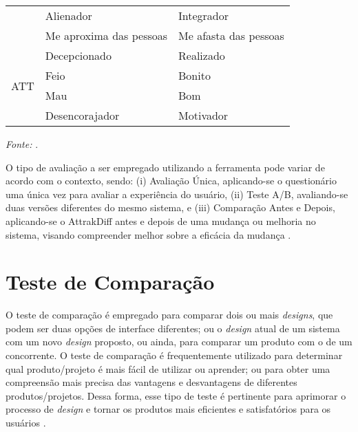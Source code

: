 \begin{table}[h]
\begin{tabular}{c|ll}
                         & \multicolumn{1}{l|}{Alienador}               & Integrador            \\ \cline{2-3} 
                         & \multicolumn{1}{l|}{Me aproxima das pessoas} & Me afasta das pessoas \\ \hline
    \multirow{4}{*}{ATT} & \multicolumn{1}{l|}{Decepcionado}            & Realizado             \\ \cline{2-3} 
                         & \multicolumn{1}{l|}{Feio}                    & Bonito                \\ \cline{2-3} 
                         & \multicolumn{1}{l|}{Mau}                     & Bom                   \\ \cline{2-3} 
                         & \multicolumn{1}{l|}{Desencorajador}          & Motivador             \\ \hline
    \end{tabular}
    \begin{tablenotes}[flushleft]
      \centering
      \item \textit{Fonte:} \cite{hassenzahl2003}.
    \end{tablenotes}
\end{table}

O tipo de avaliação a ser empregado utilizando a ferramenta pode variar de acordo com o contexto, sendo: (i) Avaliação Única, aplicando-se o questionário uma única vez para avaliar 
a experiência do usuário, (ii) Teste A/B, avaliando-se duas versões diferentes do mesmo sistema, e (iii) Comparação Antes e Depois, aplicando-se o AttrakDiff antes e 
depois de uma mudança ou melhoria no sistema,  visando compreender melhor sobre a eficácia da mudança \cite{nzongo2018}.

\section{Teste de Comparação}
\label{sec:Teste de Comparação}

O teste de comparação é empregado para comparar dois ou mais \textit{designs}, que podem ser duas opções de interface diferentes; ou o \textit{design} atual de um sistema com um novo 
\textit{design} proposto, ou ainda, para comparar um produto com o de um concorrente. O teste de comparação é frequentemente utilizado para determinar qual produto/projeto é mais fácil 
de utilizar ou aprender; ou para obter uma compreensão mais precisa das vantagens e desvantagens de diferentes produtos/projetos. Dessa forma, esse tipo de teste é pertinente para aprimorar 
o processo de \textit{design} e tornar os produtos mais eficientes e satisfatórios para os usuários \cite{rubin2011}.

